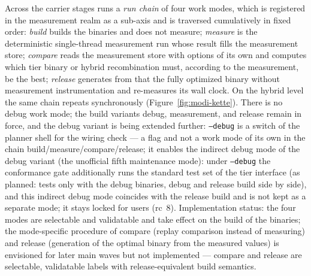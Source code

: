 \begin{nurlang}
Across the carrier stages runs a \emph{run chain} of four work modes, which is registered in the
measurement realm as a sub-axis and is traversed cumulatively in fixed order:
\emph{build} builds the binaries and does not measure; \emph{measure} is the deterministic
single-thread measurement run whose result fills the measurement store; \emph{compare} reads the measurement store
with options of its own and computes which tier binary or hybrid recombination must, according to the measurement, be the
best; \emph{release} generates from that the fully optimized binary without measurement instrumentation
and re-measures its wall clock. On the hybrid level the same chain repeats synchronously
(Figure~\ref{fig:modi-kette}). There is no debug work mode; the build variants debug, measurement, and release remain in force, and the debug variant is being extended further: \texttt{--debug} is a switch of the planner shell for the wiring check --- a flag and not a work mode of its own in
the chain build/measure/compare/release; it enables the indirect debug mode of the debug variant (the unofficial
fifth maintenance mode): under \texttt{--debug} the conformance gate additionally runs the standard test set of the
tier interface (as planned: tests only with the debug binaries, debug and
release build side by side), and this indirect debug mode coincides with the release build and is not
kept as a separate mode; it stays locked for users (rc~8). Implementation status: the
four modes are selectable and validatable and take effect on the build of the binaries; the mode-specific procedure
of compare (replay comparison instead of measuring) and release (generation of the optimal binary from the
measured values) is envisioned for later main waves but not implemented --- compare and release are
selectable, validatable labels with release-equivalent build semantics.
\begin{figure}[htbp]\centering
{}
\end{figure}
\end{nurlang}
